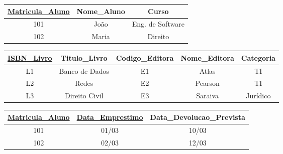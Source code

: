 \vspace{0.4cm}

\centering
\renewcommand{\arraystretch}{1.2}

\begin{adjustbox}{max width=\textwidth}
\begin{tabular}{|c|c|c|}
\hline
\textbf{\underline{Matricula\_Aluno}} & Nome\_Aluno & Curso \\ \hline
101 & João & Eng. de Software \\ \hline
102 & Maria & Direito \\ \hline
\end{tabular}
\end{adjustbox}

\vspace{0.3cm}

\vspace{0.5cm}

\begin{adjustbox}{max width=\textwidth}
\begin{tabular}{|c|c|c|c|c|}
\hline
\textbf{\underline{ISBN\_Livro}} & Titulo\_Livro & Codigo\_Editora & Nome\_Editora & Categoria \\ \hline
L1 & Banco de Dados & E1 & Atlas & TI \\ \hline
L2 & Redes & E2 & Pearson & TI \\ \hline
L3 & Direito Civil & E3 & Saraiva & Jurídico \\ \hline
\end{tabular}
\end{adjustbox}

\vspace{0.3cm}

\vspace{0.5cm}

\begin{adjustbox}{max width=\textwidth}
\begin{tabular}{|c|c|c|}
\hline
\textbf{\underline{Matricula\_Aluno}} & \textbf{\underline{Data\_Emprestimo}} & Data\_Devolucao\_Prevista \\ \hline
101 & 01/03 & 10/03 \\ \hline
102 & 02/03 & 12/03 \\ \hline
\end{tabular}
\end{adjustbox}

\vspace{0.3cm}

